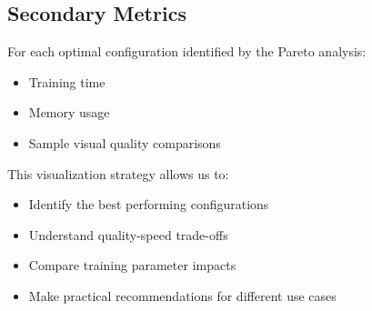 \documentclass{article}
\begin{document}
\subsection{Secondary Metrics}
For each optimal configuration identified by the Pareto analysis:
\begin{itemize}
    \item Training time
    \item Memory usage
    \item Sample visual quality comparisons
\end{itemize}

This visualization strategy allows us to:
\begin{itemize}
    \item Identify the best performing configurations
    \item Understand quality-speed trade-offs
    \item Compare training parameter impacts
    \item Make practical recommendations for different use cases
\end{itemize}
\end{document}
